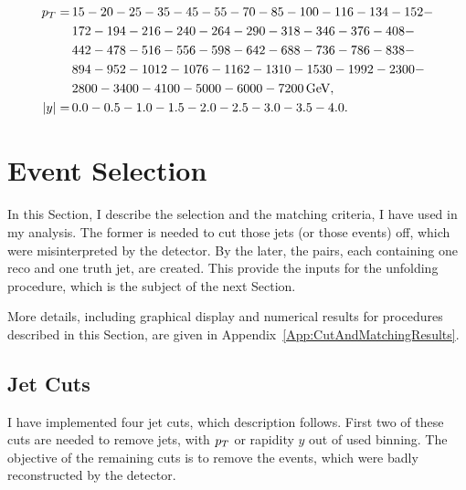 \begin{align}
  p_{T} = \, &15-20-25-35-45-55-70-85-100-116-134-152- \nonumber \\
        &172-194-216-240-264-290-318-346-376-408- \nonumber \\
        &442-478-516-556-598-642-688-736-786-838- \nonumber \\
        &894-952-1012-1076-1162-1310-1530-1992-2300- \nonumber \\
        &2800-3400-4100-5000-6000-7200 \,\text{GeV}, \nonumber \\
  |y| = \, &0.0-0.5-1.0-1.5-2.0-2.5-3.0-3.5-4.0.
  \label{eq:Binning}
\end{align}

\section{Event Selection}

In this Section, I describe the selection and the matching criteria, I have used
in my analysis. The former is needed to cut those jets (or those events) off,
which were misinterpreted by the detector. By the later, the pairs, each
containing one reco and one truth jet, are created. This provide
the inputs for the unfolding procedure, which is the subject of the next
Section.

More details, including graphical display and numerical results for procedures
described in this Section, are given in Appendix~\ref{App:CutAndMatchingResults}.

\subsection{Jet Cuts}
\label{SubSec:JetCuts}

I have implemented four jet cuts, which description follows. First two of these
cuts are needed to remove jets, with $p_{T}$ or rapidity $y$ out of used binning.
The objective of the remaining cuts is to remove the events, which were badly
reconstructed by the detector.

